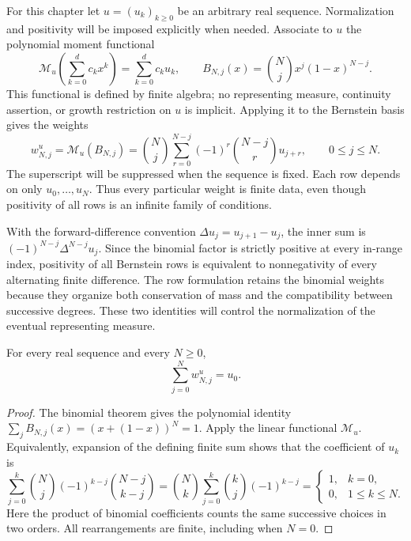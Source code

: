 \label{bern:rows}

For this chapter let $u=(u_k)_{k\ge0}$ be an arbitrary real sequence.
Normalization and positivity will be imposed explicitly when needed.
Associate to $u$ the polynomial moment functional
\[
 \mathcal M_u\!\left(\sum_{k=0}^d c_kx^k\right)
       =\sum_{k=0}^d c_ku_k,
 \qquad B_{N,j}(x)=\binom Njx^j(1-x)^{N-j}.
\]
This functional is defined by finite algebra; no representing measure,
continuity assertion, or growth restriction on $u$ is implicit. Applying
it to the Bernstein basis gives the weights
\begin{equation}\label{bern:weights}
 w^u_{N,j}=\mathcal M_u(B_{N,j})
 =\binom Nj\sum_{r=0}^{N-j}(-1)^r\binom{N-j}{r}u_{j+r},
 \qquad 0\le j\le N.
\end{equation}
The superscript will be suppressed when the sequence is fixed. Each
row depends on only $u_0,\ldots,u_N$. Thus every particular weight is
finite data, even though positivity of all rows is an infinite family
of conditions.

With the forward-difference convention $\Delta u_j=u_{j+1}-u_j$,
the inner sum is $(-1)^{N-j}\Delta^{N-j}u_j$. Since the binomial
factor is strictly positive at every in-range index, positivity of
all Bernstein rows is equivalent to nonnegativity of every alternating
finite difference. The row formulation retains the binomial weights
because they organize both conservation of mass and the compatibility
between successive degrees. These two identities will control the
normalization of the eventual representing measure.

\begin{proposition}\label{bern:mass}
For every real sequence and every $N\ge0$,
\[
 \sum_{j=0}^Nw^u_{N,j}=u_0.
\]
\end{proposition}
\begin{proof}
The binomial theorem gives the polynomial identity
$\sum_jB_{N,j}(x)=(x+(1-x))^N=1$. Apply the linear functional
$\mathcal M_u$. Equivalently, expansion of the defining finite sum
shows that the coefficient of $u_k$ is
\[
 \sum_{j=0}^k\binom Nj(-1)^{k-j}\binom{N-j}{k-j}
 =\binom Nk\sum_{j=0}^k\binom kj(-1)^{k-j}
 =\begin{cases}1,&k=0,\\0,&1\le k\le N.\end{cases}
\]
Here the product of binomial coefficients counts the same successive
choices in two orders. All rearrangements are finite, including when
$N=0$.
\end{proof}

